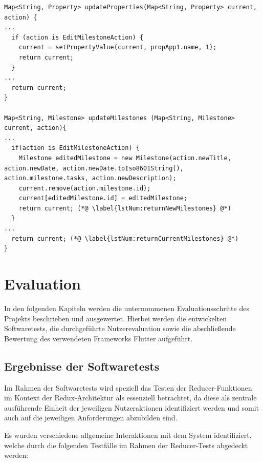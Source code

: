 \documentclass[bibliography=totoc,listof=totoc,BCOR=5mm,DIV=12,oneside]{scrbook}
\begin{document}
\newpage
\bigskip
\begin{lstlisting}[caption={Reducer Beispiel},captionpos=b, label=lst:milestoneReducer]
Map<String, Property> updateProperties(Map<String, Property> current, action) {
...
  if (action is EditMilestoneAction) {
    current = setPropertyValue(current, propApp1.name, 1);
    return current;
  }
...
  return current;
}

Map<String, Milestone> updateMilestones (Map<String, Milestone> current, action){
...
  if(action is EditMilestoneAction) {
    Milestone editedMilestone = new Milestone(action.newTitle, action.newDate, action.newDate.toIso8601String(), action.milestone.tasks, action.newDescription);
    current.remove(action.milestone.id);
    current[editedMilestone.id] = editedMilestone;
    return current; (*@ \label{lstNum:returnNewMilestones} @*)
  } 
...
  return current; (*@ \label{lstNum:returnCurrentMilestones} @*)
}
\end{lstlisting}
\bigskip

\chapter{Evaluation} \label{chap:nachweisführung}
\par In den folgenden Kapiteln werden die unternommenen Evaluationsschritte des Projekts beschrieben und ausgewertet. Hierbei werden die entwickelten Softwaretests, die durchgeführte Nutzerevaluation sowie die abschließende Bewertung des verwendeten Frameworks Flutter aufgeführt.

\section{Ergebnisse der Softwaretests}
\par Im Rahmen der Softwaretests wird speziell das Testen der Reducer-Funktionen im Kontext der Redux-Architektur als essenziell betrachtet, da diese als zentrale ausführende Einheit der jeweiligen Nutzeraktionen identifiziert werden und somit auch auf die jeweiligen Anforderungen abzubilden sind.
\par \bigskip Es wurden verschiedene allgemeine Interaktionen mit dem System identifiziert, welche durch die folgenden Testfälle im Rahmen der Reducer-Tests abgedeckt werden: 
\end{document}
